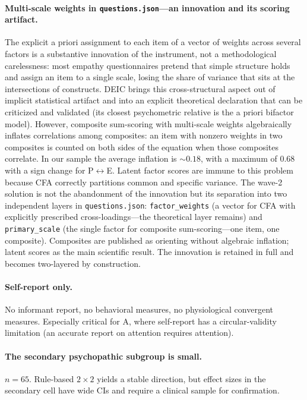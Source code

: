 \paragraph{Multi-scale weights in \texttt{questions.json}---an innovation and its scoring artifact.} The explicit a priori assignment to each item of a vector of weights across several factors is a substantive innovation of the instrument, not a methodological carelessness: most empathy questionnaires pretend that simple structure holds and assign an item to a single scale, losing the share of variance that sits at the intersections of constructs. DEIC brings this cross-structural aspect out of implicit statistical artifact and into an explicit theoretical declaration that can be criticized and validated (its closest psychometric relative is the a priori bifactor model). However, composite sum-scoring with multi-scale weights algebraically inflates correlations among composites: an item with nonzero weights in two composites is counted on both sides of the equation when those composites correlate. In our sample the average inflation is $\sim 0.18$, with a maximum of $0.68$ with a sign change for P$\leftrightarrow$E. Latent factor scores are immune to this problem because CFA correctly partitions common and specific variance. The wave-2 solution is not the abandonment of the innovation but its separation into two independent layers in \texttt{questions.json}: \texttt{factor\_weights} (a vector for CFA with explicitly prescribed cross-loadings---the theoretical layer remains) and \texttt{primary\_scale} (the single factor for composite sum-scoring---one item, one composite). Composites are published as orienting without algebraic inflation; latent scores as the main scientific result. The innovation is retained in full and becomes two-layered by construction.

\paragraph{Self-report only.} No informant report, no behavioral measures, no physiological convergent measures. Especially critical for A, where self-report has a circular-validity limitation (an accurate report on attention requires attention).

\paragraph{The secondary psychopathic subgroup is small.} $n = 65$. Rule-based $2 \times 2$ yields a stable direction, but effect sizes in the secondary cell have wide CIs and require a clinical sample for confirmation.

